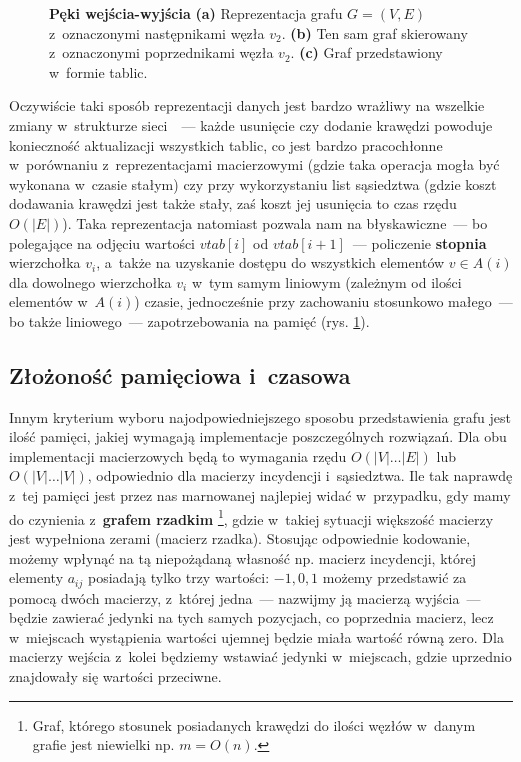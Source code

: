 \begin{figure}[!htbp]
\begin{subfigure}[b]{0.50\textwidth}
		\caption{}
	\end{subfigure}
	\caption{\textbf{Pęki wejścia-wyjścia} \textbf{(a)} Reprezentacja grafu $G = \left( V, E \right)$ z~oznaczonymi następnikami węzła $v_{2}$. \textbf{(b)} Ten sam graf skierowany z~oznaczonymi poprzednikami węzła $v_{2}$. \textbf{(c)} Graf przedstawiony w~formie tablic.}\label{fig:forwardReverseStarRepresentation}
\end{figure}

Oczywiście taki sposób reprezentacji danych jest bardzo wrażliwy na wszelkie zmiany w~strukturze sieci~\cite{eCOMPASS_TR_005}~---  każde usunięcie czy dodanie krawędzi powoduje konieczność aktualizacji wszystkich tablic, co jest bardzo pracochłonne w~porównaniu z~reprezentacjami macierzowymi (gdzie taka operacja mogła być wykonana w~czasie stałym) czy przy wykorzystaniu list sąsiedztwa (gdzie koszt dodawania krawędzi jest także stały, zaś koszt jej usunięcia to czas rzędu $ O \left( \left| E \right| \right) $). Taka reprezentacja natomiast pozwala nam na błyskawiczne~---  bo polegające na odjęciu wartości $vtab \left[ i \right] $ od $vtab \left[ i+1 \right] $~---  policzenie \textbf{stopnia} wierzchołka $v_{i}$, a~także na uzyskanie dostępu do wszystkich elementów $ v \in A \left( i \right) $ dla dowolnego wierzchołka $v_{i}$ w~tym samym liniowym (zależnym od ilości elementów w~$A \left( i \right) $) czasie, jednocześnie przy zachowaniu stosunkowo małego~---  bo także liniowego~---  zapotrzebowania na pamięć (rys. \ref{fig:forwardReverseStarRepresentation}).

\subsection{Złożoność pamięciowa i~czasowa}

Innym kryterium wyboru najodpowiedniejszego sposobu przedstawienia grafu jest ilość pamięci, jakiej wymagają implementacje poszczególnych rozwiązań. Dla obu implementacji macierzowych będą to wymagania rzędu $O \left( \left| V \right| \ldots \left| E \right| \right)$ lub $O \left( \left| V \right| \ldots \left| V \right| \right)$, odpowiednio dla macierzy incydencji i~sąsiedztwa. Ile tak naprawdę z~tej pamięci jest przez nas marnowanej najlepiej widać w~przypadku, gdy mamy do czynienia z~\textbf{grafem rzadkim} \footnote{Graf, którego stosunek posiadanych krawędzi do ilości węzłów w~danym grafie jest niewielki np. $m = O \left( n \right)$.}, gdzie w~takiej sytuacji większość macierzy jest wypełniona zerami (macierz rzadka). Stosując odpowiednie kodowanie, możemy wpłynąć na tą niepożądaną własność np. macierz incydencji, której elementy $a_{ij}$ posiadają tylko trzy wartości: $-1, 0, 1$ możemy przedstawić za pomocą dwóch macierzy, z~której jedna~---  nazwijmy ją macierzą wyjścia~---  będzie zawierać jedynki na tych samych pozycjach, co poprzednia macierz, lecz w~miejscach wystąpienia wartości ujemnej będzie miała wartość równą zero. Dla macierzy wejścia z~kolei będziemy wstawiać jedynki w~miejscach, gdzie uprzednio znajdowały się wartości przeciwne.


